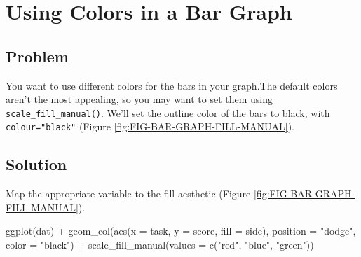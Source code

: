 \documentclass[
]{book}
\newenvironment{Shaded}{\begin{snugshade}}{\end{snugshade}}
\newcommand{\AttributeTok}[1]{\textcolor[rgb]{0.77,0.63,0.00}{#1}}
\newcommand{\FunctionTok}[1]{\textcolor[rgb]{0.00,0.00,0.00}{#1}}
\newcommand{\NormalTok}[1]{#1}
\newcommand{\SpecialCharTok}[1]{\textcolor[rgb]{0.00,0.00,0.00}{#1}}
\newcommand{\StringTok}[1]{\textcolor[rgb]{0.31,0.60,0.02}{#1}}
\begin{document}
\hypertarget{BAR-GRAPH-COLORS}{%
\section{Using Colors in a Bar Graph}\label{BAR-GRAPH-COLORS}}

\hypertarget{problem-17}{%
\subsection{Problem}\label{problem-17}}

You want to use different colors for the bars in your graph.The default colors aren't the most appealing, so you may want to set them using \texttt{scale\_fill\_manual()}. We'll set the outline color of the bars to black, with \texttt{colour="black"} (Figure \ref{fig:FIG-BAR-GRAPH-FILL-MANUAL}).

\hypertarget{solution-17}{%
\subsection{Solution}\label{solution-17}}

Map the appropriate variable to the fill aesthetic (Figure \ref{fig:FIG-BAR-GRAPH-FILL-MANUAL}).

\begin{Shaded}
\begin{Highlighting}[]
\FunctionTok{ggplot}\NormalTok{(dat) }\SpecialCharTok{+}
  \FunctionTok{geom\_col}\NormalTok{(}\FunctionTok{aes}\NormalTok{(}\AttributeTok{x =}\NormalTok{ task, }\AttributeTok{y =}\NormalTok{ score, }\AttributeTok{fill =}\NormalTok{ side), }\AttributeTok{position =} \StringTok{"dodge"}\NormalTok{, }\AttributeTok{color =} \StringTok{"black"}\NormalTok{) }\SpecialCharTok{+}
  \FunctionTok{scale\_fill\_manual}\NormalTok{(}\AttributeTok{values =} \FunctionTok{c}\NormalTok{(}\StringTok{"red"}\NormalTok{, }\StringTok{"blue"}\NormalTok{, }\StringTok{"green"}\NormalTok{)) }
\end{Highlighting}
\end{Shaded}
\end{document}
